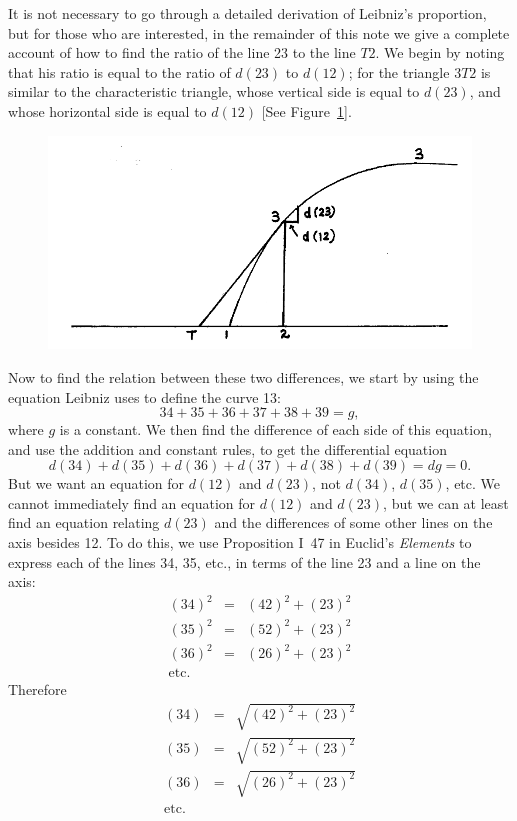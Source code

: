 \documentclass[twoside,openright]{article}
\newlength{\oldjot}
\begin{document}
It is not necessary to go through a detailed derivation of Leibniz's
proportion, but for those who are interested, in the remainder of this
note we give a complete account of how to find the ratio of the line
23 to the line $T2$. We begin by noting that his ratio is equal to the
ratio of $d(23)$ to $d(12)$; for the triangle $3T2$ is similar to the
characteristic triangle, whose vertical side is equal to $d(23)$, and
whose horizontal side is equal to $d(12)$ [See Figure~\ref{locus2A}].
\begin{figure}[htp]
\begin{center}
\includegraphics[width=\textwidth]{fig/Figure25}
\caption{}
\label{locus2A}
\vspace{-10pt}
\end{center}
\end{figure} Now to find the relation between these two differences,
we start by using the equation Leibniz uses to define the curve 13:
$$34 + 35 + 36 + 37 + 38 + 39 = g,$$
where $g$ is a constant.  We then find the difference of each side of
this equation, and use the addition and constant rules, to get the
differential equation
$$d(34) + d(35) + d(36) + d(37) + d(38) + d(39) = dg = 0.$$
But we want an equation for $d(12)$ and $d(23)$, not $d(34)$, $d(35)$,
etc.  We cannot immediately find an equation for $d(12)$ and $d(23)$,
but we can at least find an equation relating $d(23)$ and the
differences of some other lines on the axis besides 12.  To do this,
we use Proposition I~47 in Euclid's {\em Elements} to express each of
the lines 34, 35, etc., in terms of the line 23 and a line on the
axis: \setlength{\jot}{1ex}
\begin{eqnarray*}
(34)^2 & = & (42)^2 + (23)^2\\
(35)^2 & = & (52)^2 + (23)^2\\
(36)^2 & = & (26)^2 + (23)^2\\
\mbox{etc.} & & 
\end{eqnarray*}
\setlength{\jot}{\oldjot}
Therefore
\setlength{\jot}{1.5ex}
\begin{eqnarray*}
(34) & = & \sqrt{(42)^2 + (23)^2}\\
(35) & = & \sqrt{(52)^2 + (23)^2}\\
(36) & = & \sqrt{(26)^2 + (23)^2}\\
\mbox{etc.} & & 
\end{eqnarray*}
\setlength{\jot}{\oldjot}
\end{document}
